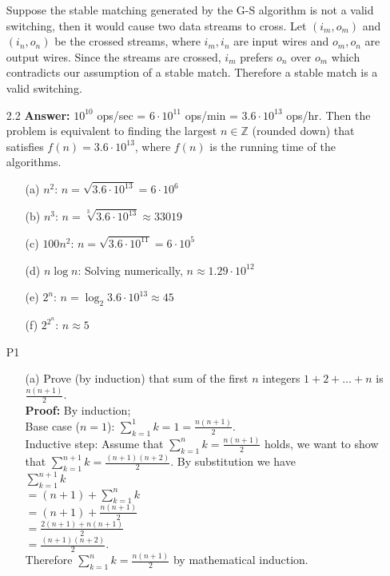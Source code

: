 \documentclass{article}
\begin{document}
\begin{itemize}
            Suppose the stable matching generated by the G-S algorithm is not a valid switching, then it would cause two data streams to cross. Let $(i_m,o_m)$ and $(i_n,o_n) $ be the crossed streams, where $i_m,i_n$ are input wires and $o_m,o_n$ are output wires. Since the streams are crossed, $i_m$ prefers $o_n$ over $o_m$ which contradicts our assumption of a stable match. Therefore a stable match is a valid switching.
      \item [2.2]
            \textbf{Answer:} $10^{10}$ ops/sec = $6\cdot 10^{11}$ ops/min = $3.6\cdot 10^{13}$ ops/hr. Then the problem is equivalent to finding the largest $n\in\mathbb{Z}$ (rounded down) that satisfies $f(n)=3.6\cdot 10^{13}$, where $f(n)$ is the running time of the algorithms.
            \begin{itemize}
                  \item [(a)] $n^2$: $n=\sqrt{3.6\cdot 10^{13}}=\boxed{6\cdot 10^6}$
                  \item [(b)] $n^3$: $n=\sqrt[3]{3.6\cdot 10^{13}}\approx\boxed{33019}$
                  \item [(c)] $100n^2$: $n=\sqrt{3.6\cdot 10^{11}}=\boxed{6\cdot 10^5}$
                  \item [(d)] $n\log n$: Solving numerically, $n\approx\boxed{1.29\cdot 10^{12}}$
                  \item [(e)] $2^n$: $n=\log_2 3.6\cdot 10^{13}\approx\boxed{45}$
                  \item [(f)] $2^{2^n}$: $n\approx\boxed{5}$
            \end{itemize}
      \item [P1]
            \begin{itemize}
                  \item [(a)] Prove (by induction) that sum of the first $n$ integers $1+2+\ldots+n$ is $\frac{n(n+1)}{2}$.\\
                        \textbf{Proof:} By induction; \\Base case ($n=1$): $\sum_{k=1}^1 k=1=\frac{n(n+1)}{2}$.\\Inductive step: Assume that $\sum_{k=1}^n k=\frac{n(n+1)}{2}$ holds, we want to show that $\sum_{k=1}^{n+1} k=\frac{(n+1)(n+2)}{2}$. By substitution we have \\$\sum_{k=1}^{n+1} k$\\$=(n+1)+\sum_{k=1}^n k$\\$=(n+1)+\frac{n(n+1)}{2}$\\$=\frac{2(n+1)+n(n+1)}{2}$\\$=\frac{(n+1)(n+2)}{2}$.\\Therefore $\sum_{k=1}^n k=\frac{n(n+1)}{2}$ by mathematical induction.

\end{itemize}
\end{itemize}
\end{document}
